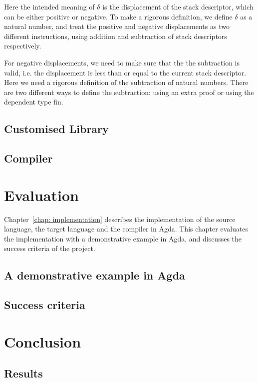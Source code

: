 \documentclass[12pt,twoside,a4paper]{report}
\theoremstyle{definition}
\theoremstyle{definition}
\theoremstyle{definition}
\theoremstyle{definition}
\newcommand{\chapref}[1]{\ref{#1}}
\begin{document}
    Here the intended meaning of $\delta$ is the displacement of the stack descriptor, which can be either positive or negative. To make a rigorous definition, we define $\delta$ as a natural number, and treat the positive and negative displacements as two different instructions, using addition and subtraction of stack descriptors respectively. 

    For negative displacements, we need to make sure that the the subtraction is valid, i.e. the displacement is less than or equal to the current stack descriptor. Here we need a rigorous definition of the subtraction of natural numbers. There are two different ways to define the subtraction: using an extra proof or using the dependent type fin.

    \section{Customised Library}


    \section{Compiler}




\chapter{Evaluation}
    \minitoc
    Chapter~\chapref{chap: implementation} describes the implementation of the source language, the target language and the compiler in Agda. This chapter evaluates the implementation with a demonstrative example in Agda, and discusses the success criteria of the project.
    \section{A demonstrative example in Agda}

    \section{Success criteria}

\chapter{Conclusion}
    \minitoc
    \section{Results}
\end{document}
